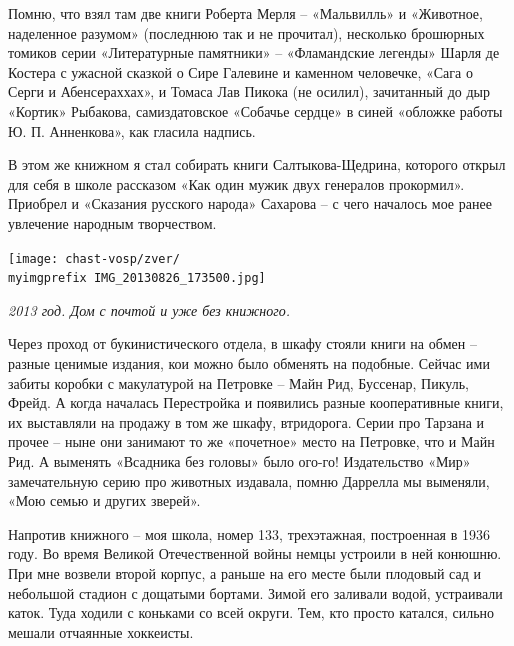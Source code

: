 Помню, что взял там две книги Роберта Мерля – «Мальвилль» и «Животное, наделенное разумом» (последнюю так и не прочитал), несколько брошюрных томиков серии «Литературные памятники» – «Фламандские легенды» Шарля де Костера с ужасной сказкой о Сире Галевине и каменном человечке, «Сага о Серги и Абенсераххах», и Томаса Лав Пикока (не осилил), зачитанный до дыр «Кортик» Рыбакова, самиздатовское «Собачье сердце» в синей «обложке работы Ю. П. Анненкова», как гласила надпись. 

В этом же книжном я стал собирать книги Салтыкова-Щедрина, которого открыл для себя в школе рассказом «Как один мужик двух генералов прокормил». Приобрел и «Сказания русского народа» Сахарова – с чего началось мое ранее увлечение народным творчеством.

\begin{center}
\texttt{[image: chast-vosp/zver/\\myimgprefix IMG\_20130826\_173500.jpg]}

\textit{2013 год. Дом с почтой и уже без книжного.}
\end{center}

Через проход от букинистического отдела, в шкафу стояли книги на обмен – разные ценимые издания, кои можно было обменять на подобные. Сейчас ими забиты коробки с макулатурой на Петровке – Майн Рид, Буссенар, Пикуль, Фрейд. А когда началась Перестройка и появились разные кооперативные книги, их выставляли на продажу в том же шкафу, втридорога. Серии про Тарзана и прочее – ныне они занимают то же «почетное» место на Петровке, что и Майн Рид. А выменять «Всадника без головы» было ого-го! Издательство «Мир» замечательную серию про животных издавала, помню Даррелла мы выменяли, «Мою семью и других зверей».


Напротив книжного – моя школа, номер 133, трехэтажная, построенная в 1936 году. Во время Великой Отечественной войны немцы устроили в ней конюшню. При мне возвели второй корпус, а раньше на его месте были плодовый сад и небольшой стадион с дощатыми бортами. Зимой его заливали водой, устраивали каток. Туда ходили с коньками со всей округи. Тем, кто просто катался, сильно мешали отчаянные хоккеисты.



